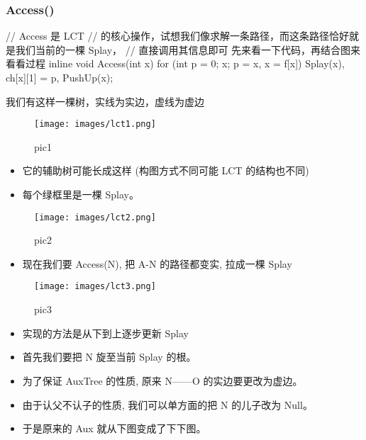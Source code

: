 \subsubsection{Access() }

\begin{cppcode}
// Access 是 LCT
// 的核心操作，试想我们像求解一条路径，而这条路径恰好就是我们当前的一棵 Splay，
// 直接调用其信息即可 先来看一下代码，再结合图来看看过程
inline void Access(int x) {
  for (int p = 0; x; p = x, x = f[x]) {
    Splay(x), ch[x][1] = p, PushUp(x);
  }
}
\end{cppcode}

我们有这样一棵树，实线为实边，虚线为虚边 

\begin{figure}[h]
\centering
\texttt{[image: images/lct1.png]} 
\caption{pic1}
\end{figure}

\begin{itemize}
\item 它的辅助树可能长成这样 (构图方式不同可能 LCT 的结构也不同)
\item 每个绿框里是一棵 Splay。
\end{itemize}

\begin{figure}[h]
\centering
\texttt{[image: images/lct2.png]} 
\caption{pic2}
\end{figure}

\begin{itemize}
\item 现在我们要 Access(N), 把 A-N 的路径都变实, 拉成一棵 Splay
\end{itemize}

\begin{figure}[h]
\centering
\texttt{[image: images/lct3.png]} 
\caption{pic3}
\end{figure}

\begin{itemize}
\item 实现的方法是从下到上逐步更新 Splay
\item 首先我们要把 N 旋至当前 Splay 的根。
\item 为了保证 AuxTree 的性质, 原来 N——O 的实边要更改为虚边。
\item 由于认父不认子的性质, 我们可以单方面的把 N 的儿子改为 Null。
\item 于是原来的 Aux 就从下图变成了下下图。
\end{itemize}


